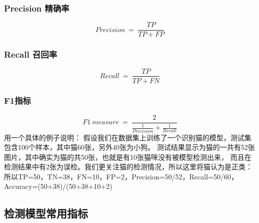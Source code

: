 \documentclass{article}
\begin{document}
\begin{CJK}{UTF8}{gbsn}
\hypertarget{precession}{}
\subsubsection{Precision 精确率}
    \begin{equation}
        Precision \ = \ \frac{TP}{TP+FP}
    \end{equation}

\hypertarget{recall}{}
\subsubsection{Recall 召回率}
    \begin{equation}
        Recall \ = \ \frac{TP}{TP+FN}
    \end{equation}
\subsubsection{F1指标}
    \begin{equation}
        F1\ measure\ = \ \frac{2}{\frac{1}{Precision}+\frac{1}{Recall}}
    \end{equation}
用一个具体的例子说明：
假设我们在数据集上训练了一个识别猫的模型，测试集包含100个样本，其中猫60张，另外40张为小狗。
测试结果显示为猫的一共有52张图片，其中确实为猫的共50张，也就是有10张猫咪没有被模型检测出来，
而且在检测结果中有2张为误检。我们更关注猫的检测情况，所以这里将猫认为是正类：\\
所以TP=50，TN=38，FN=10，FP=2，Precision=50/52，Recall=50/60，Accuracy=(50+38)/(50+38+10+2)\\

\subsection{检测模型常用指标}


\end{CJK}
\end{document}

